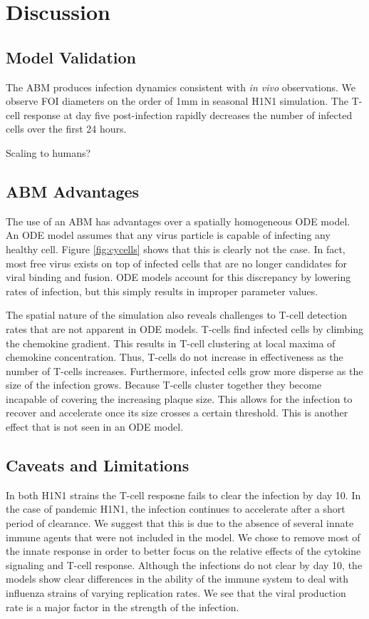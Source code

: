 \documentclass[10pt]{article}
\begin{document}
\section*{Discussion}

\subsection*{Model Validation}

The ABM produces infection dynamics consistent with \textit{in vivo} observations.  We observe FOI diameters on the order of 1mm in seasonal H1N1 simulation.  The T-cell response at day five post-infection rapidly decreases the number of infected cells over the first 24 hours.

Scaling to humans?

\subsection*{ABM Advantages}

The use of an ABM has advantages over a spatially homogeneous ODE model.  An ODE model assumes that any virus particle is capable of infecting any healthy cell.  Figure \ref{fig:cycells} shows that this is clearly not the case.  In fact, most free virus exists on top of infected cells that are no longer candidates for viral binding and fusion.  ODE models account for this discrepancy by lowering rates of infection, but this simply results in improper parameter values. 

The spatial nature of the simulation also reveals challenges to T-cell detection rates that are not apparent in ODE models.  T-cells find infected cells by climbing the chemokine gradient.  This results in T-cell clustering at local maxima of chemokine concentration.  Thus, T-cells do not increase in effectiveness as the number of T-cells increases.  Furthermore, infected cells grow more disperse as the size of the infection grows.  Because T-cells cluster together they become incapable of covering the increasing plaque size.  This allows for the infection to recover and accelerate once its size crosses a certain threshold.  This is another effect that is not seen in an ODE model.


\subsection*{Caveats and Limitations}

In both H1N1 strains the T-cell resposne fails to clear the infection by day 10.  In the case of pandemic H1N1, the infection continues to accelerate after a short period of clearance.  We suggest that this is due to the absence of several innate immune agents that were not included in the model.  We chose to remove most of the innate response in order to better focus on the relative effects of the cytokine signaling and T-cell response.  Although the infections do not clear by day 10, the models show clear differences in the ability of the immune system to deal with influenza strains of varying replication rates.  We see that the viral production rate is a major factor in the strength of the infection.
\end{document}
